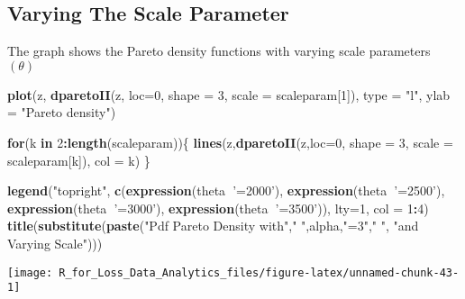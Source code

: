 \documentclass[]{book}
\newenvironment{Shaded}{\begin{snugshade}}{\end{snugshade}}
\newcommand{\KeywordTok}[1]{\textcolor[rgb]{0.13,0.29,0.53}{\textbf{#1}}}
\newcommand{\DataTypeTok}[1]{\textcolor[rgb]{0.13,0.29,0.53}{#1}}
\newcommand{\DecValTok}[1]{\textcolor[rgb]{0.00,0.00,0.81}{#1}}
\newcommand{\StringTok}[1]{\textcolor[rgb]{0.31,0.60,0.02}{#1}}
\newcommand{\ControlFlowTok}[1]{\textcolor[rgb]{0.13,0.29,0.53}{\textbf{#1}}}
\newcommand{\OperatorTok}[1]{\textcolor[rgb]{0.81,0.36,0.00}{\textbf{#1}}}
\newcommand{\NormalTok}[1]{#1}
\theoremstyle{definition}
\theoremstyle{definition}
\theoremstyle{definition}
\theoremstyle{remark}
\begin{document}
\subsection{Varying The Scale
Parameter}\label{varying-the-scale-parameter-1}

The graph shows the Pareto density functions with varying scale
parameters \((\theta)\)

\begin{Shaded}
\begin{Highlighting}[]
\KeywordTok{plot}\NormalTok{(z, }\KeywordTok{dparetoII}\NormalTok{(z, }\DataTypeTok{loc=}\DecValTok{0}\NormalTok{, }\DataTypeTok{shape =} \DecValTok{3}\NormalTok{, }\DataTypeTok{scale =}\NormalTok{ scaleparam[}\DecValTok{1}\NormalTok{]), }\DataTypeTok{type =} \StringTok{"l"}\NormalTok{, }\DataTypeTok{ylab =} \StringTok{"Pareto density"}\NormalTok{)}

\ControlFlowTok{for}\NormalTok{(k }\ControlFlowTok{in} \DecValTok{2}\OperatorTok{:}\KeywordTok{length}\NormalTok{(scaleparam))\{}
  \KeywordTok{lines}\NormalTok{(z,}\KeywordTok{dparetoII}\NormalTok{(z,}\DataTypeTok{loc=}\DecValTok{0}\NormalTok{, }\DataTypeTok{shape =} \DecValTok{3}\NormalTok{, }\DataTypeTok{scale =}\NormalTok{ scaleparam[k]), }\DataTypeTok{col =}\NormalTok{ k)}
\NormalTok{\}}

\KeywordTok{legend}\NormalTok{(}\StringTok{"topright"}\NormalTok{, }\KeywordTok{c}\NormalTok{(}\KeywordTok{expression}\NormalTok{(theta}\OperatorTok{~}\StringTok{'=2000'}\NormalTok{), }\KeywordTok{expression}\NormalTok{(theta}\OperatorTok{~}\StringTok{'=2500'}\NormalTok{), }\KeywordTok{expression}\NormalTok{(theta}\OperatorTok{~}\StringTok{'=3000'}\NormalTok{), }\KeywordTok{expression}\NormalTok{(theta}\OperatorTok{~}\StringTok{'=3500'}\NormalTok{)), }\DataTypeTok{lty=}\DecValTok{1}\NormalTok{, }\DataTypeTok{col =} \DecValTok{1}\OperatorTok{:}\DecValTok{4}\NormalTok{)}
\KeywordTok{title}\NormalTok{(}\KeywordTok{substitute}\NormalTok{(}\KeywordTok{paste}\NormalTok{(}\StringTok{"Pdf Pareto Density with"}\NormalTok{,}\StringTok{" "}\NormalTok{,alpha,}\StringTok{"=3"}\NormalTok{,}\StringTok{" "}\NormalTok{, }\StringTok{"and Varying Scale"}\NormalTok{)))}
\end{Highlighting}
\end{Shaded}

\begin{center}\texttt{[image: R\_for\_Loss\_Data\_Analytics\_files/figure-latex/unnamed-chunk-43-1]} \end{center}
\end{document}
